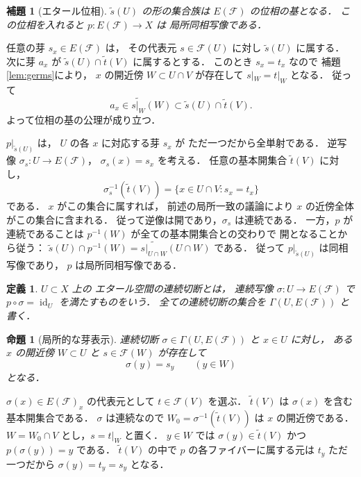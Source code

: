 \documentclass[a5paper,10pt,onecolumn]{jsarticle}
\makeatletter
\theoremstyle{mathnotetheorem}
\newtheorem{definition}[theorem]{定義}
\newtheorem{lemma}[theorem]{補題}
\newtheorem{proposition}[theorem]{命題}
\renewcommand{\proofname}{証明}
\renewenvironment{proof}[1][\proofname]{%
  \par\pushQED{\qed}\normalfont\topsep4\p@\@plus2\p@\relax
  \trivlist\item[\hskip\labelsep\bfseries #1]\ignorespaces
}{\popQED\endtrivlist\@endpefalse}
\makeatother
\begin{document}
\begin{lemma}[エタール位相]\label{lem:etale-basis}
$\widetilde s(U)$ の形の集合族は
$E(\mathcal F)$ の位相の基となる．
この位相を入れると $p:E(\mathcal F)\to X$ は
局所同相写像である．
\end{lemma}
\begin{proof}
任意の芽 $s_x\in E(\mathcal F)$ は，
その代表元 $s\in\mathcal F(U)$ に対し
$\widetilde s(U)$ に属する．
次に芽 $a_x$ が
$\widetilde s(U)\cap\widetilde t(V)$ に属するとする．
このとき $s_x=t_x$ なので
補題\ref{lem:germs}により，
$x$ の開近傍 $W\subset U\cap V$ が存在して
$s|_W=t|_W$ となる．
従って
\[
 a_x\in\widetilde{s|_W}(W)
 \subset\widetilde s(U)\cap\widetilde t(V).
\]
よって位相の基の公理が成り立つ．

$p|_{\widetilde s(U)}$ は，
$U$ の各 $x$ に対応する芽 $s_x$ が
ただ一つだから全単射である．
逆写像
$\sigma_s:U\to E(\mathcal F)$，
$\sigma_s(x)=s_x$ を考える．
任意の基本開集合 $\widetilde t(V)$ に対し，
\[
 \sigma_s^{-1}(\widetilde t(V))
 =\{x\in U\cap V:s_x=t_x\}
\]
である．
$x$ がこの集合に属すれば，
前述の局所一致の議論により
$x$ の近傍全体がこの集合に含まれる．
従って逆像は開であり，$\sigma_s$ は連続である．
一方，$p$ が連続であることは
$p^{-1}(W)$ が全ての基本開集合との交わりで
開となることから従う：
$\widetilde s(U)\cap p^{-1}(W)
=\widetilde{s|_{U\cap W}}(U\cap W)$ である．
従って
$p|_{\widetilde s(U)}$ は同相写像であり，
$p$ は局所同相写像である．
\end{proof}

\begin{definition}
$U\subset X$ 上の
\emph{エタール空間の連続切断}とは，
連続写像 $\sigma:U\to E(\mathcal F)$ で
$p\circ\sigma=\operatorname{id}_U$ を満たすものをいう．
全ての連続切断の集合を
$\Gamma(U,E(\mathcal F))$ と書く．
\end{definition}

\begin{proposition}[局所的な芽表示]\label{prop:local-representation}
連続切断 $\sigma\in\Gamma(U,E(\mathcal F))$ と
$x\in U$ に対し，
ある $x$ の開近傍 $W\subset U$ と
$s\in\mathcal F(W)$ が存在して
\[
 \sigma(y)=s_y\qquad(y\in W)
\]
となる．
\end{proposition}
\begin{proof}
$\sigma(x)\in E(\mathcal F)_x$ の代表元として
$t\in\mathcal F(V)$ を選ぶ．
$\widetilde t(V)$ は $\sigma(x)$ を含む基本開集合である．
$\sigma$ は連続なので
$W_0=\sigma^{-1}(\widetilde t(V))$ は
$x$ の開近傍である．
$W=W_0\cap V$ とし，$s=t|_W$ と置く．
$y\in W$ では $\sigma(y)\in\widetilde t(V)$ かつ
$p(\sigma(y))=y$ である．
$\widetilde t(V)$ の中で $p$ の各ファイバーに属する元は
$t_y$ ただ一つだから $\sigma(y)=t_y=s_y$ となる．
\end{proof}
\end{document}
